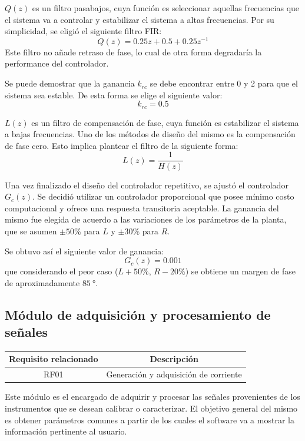\documentclass[../et.tex]{subfiles}
\begin{document}
  $Q(z)$ es un filtro pasabajos, cuya función es seleccionar aquellas frecuencias que el sistema va a controlar y estabilizar el sistema a altas frecuencias. Por su simplicidad, se eligió el siguiente filtro FIR:
  \[
      Q(z) = 0.25 z + 0.5 + 0.25 z^{-1}
  \]
  Este filtro no añade retraso de fase, lo cual de otra forma degradaría la performance del controlador.

  Se puede demostrar que la ganancia $k_{rc}$ se debe encontrar entre 0 y 2 para que el sistema sea estable. De esta forma se elige el siguiente valor:
  \[
      k_{rc} = 0.5
  \]

  $L(z)$ es un filtro de compensación de fase, cuya función es estabilizar el sistema a bajas frecuencias. Uno de los métodos de diseño del mismo es la compensación de fase cero. Esto implica plantear el filtro de la siguiente forma:
  \[
      L(z) = \frac{1}{H(z)}
  \]

  Una vez finalizado el diseño del controlador repetitivo, se ajustó el controlador $G_c(z)$. Se decidió utilizar un controlador proporcional que posee mínimo costo computacional y ofrece una respuesta transitoria aceptable. La ganancia del mismo fue elegida de acuerdo a las variaciones de los parámetros de la planta, que se asumen $\pm 50\%$ para $L$ y $\pm 30\%$ para $R$.

  Se obtuvo así el siguiente valor de ganancia:
  \[
      G_c(z) = 0.001
  \]
  que considerando el peor caso ($L + 50\%$, $R - 20\%$) se obtiene un margen de fase de aproximadamente $\SI{85}{\degree}$.

\subsection{Módulo de adquisición y procesamiento de señales}
\begin{table}[H]
  \centering
  \begin{tabular}{|c|c|}
    \hline
    \rowcolor[HTML]{C0C0C0}
    Requisito relacionado   & Descripción                                     \\ \hline
    RF01                    & Generación y adquisición de corriente           \\ \hline
  \end{tabular}
\end{table}

Este módulo es el encargado de adquirir y procesar las señales provenientes de los instrumentos que se desean calibrar o caracterizar. El objetivo general del mismo es obtener parámetros comunes a partir de los cuales el software va a mostrar la información pertinente al usuario.
\end{document}
